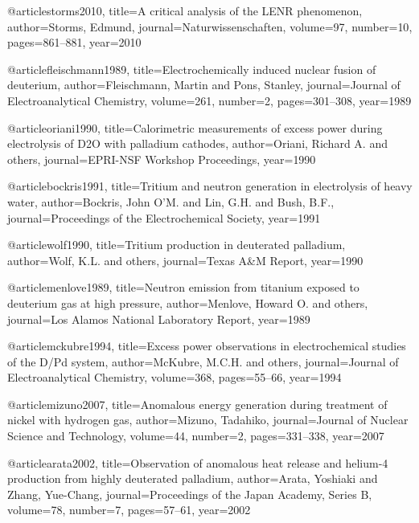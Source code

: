     @article{storms2010,
      title={A critical analysis of the LENR phenomenon},
      author={Storms, Edmund},
      journal={Naturwissenschaften},
      volume={97},
      number={10},
      pages={861--881},
      year={2010}
    }
    
    @article{fleischmann1989,
      title={Electrochemically induced nuclear fusion of deuterium},
      author={Fleischmann, Martin and Pons, Stanley},
      journal={Journal of Electroanalytical Chemistry},
      volume={261},
      number={2},
      pages={301--308},
      year={1989}
    }
    
    @article{oriani1990,
      title={Calorimetric measurements of excess power during electrolysis of D2O with palladium cathodes},
      author={Oriani, Richard A. and others},
      journal={EPRI-NSF Workshop Proceedings},
      year={1990}
    }
    
    @article{bockris1991,
      title={Tritium and neutron generation in electrolysis of heavy water},
      author={Bockris, John O'M. and Lin, G.H. and Bush, B.F.},
      journal={Proceedings of the Electrochemical Society},
      year={1991}
    }
    
    @article{wolf1990,
      title={Tritium production in deuterated palladium},
      author={Wolf, K.L. and others},
      journal={Texas A\&M Report},
      year={1990}
    }
    
    @article{menlove1989,
      title={Neutron emission from titanium exposed to deuterium gas at high pressure},
      author={Menlove, Howard O. and others},
      journal={Los Alamos National Laboratory Report},
      year={1989}
    }
    
    @article{mckubre1994,
      title={Excess power observations in electrochemical studies of the D/Pd system},
      author={McKubre, M.C.H. and others},
      journal={Journal of Electroanalytical Chemistry},
      volume={368},
      pages={55--66},
      year={1994}
    }
    
    @article{mizuno2007,
      title={Anomalous energy generation during treatment of nickel with hydrogen gas},
      author={Mizuno, Tadahiko},
      journal={Journal of Nuclear Science and Technology},
      volume={44},
      number={2},
      pages={331--338},
      year={2007}
    }
    
    @article{arata2002,
      title={Observation of anomalous heat release and helium-4 production from highly deuterated palladium},
      author={Arata, Yoshiaki and Zhang, Yue-Chang},
      journal={Proceedings of the Japan Academy, Series B},
      volume={78},
      number={7},
      pages={57--61},
      year={2002}
    }
    
